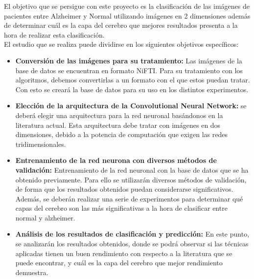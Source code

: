 
El objetivo que se persigue con este proyecto es la clasificación de las imágenes de pacientes entre Alzheimer y Normal utilizando imágenes en 2 dimensiones además de determinar cuál es la capa del cerebro que mejores resultados presenta a la hora de realizar esta clasificación. \\

El estudio que se realiza puede dividirse en los siguientes objetivos específicos:
\begin{itemize}
	\item \textbf{Conversión de las imágenes para su tratamiento:} Las imágenes de la base de datos se encuentran en formato NiFTI. Para su tratamiento con los algoritmos, debemos convertirlas a un formato con el que estos puedan tratar. Con esto se creará la base de datos para su uso en los distintos experimentos.
	\item \textbf{Elección de la arquitectura de la Convolutional Neural Network:} se deberá elegir una arquitectura para la red neuronal basándonos en la literatura actual. Esta arquitectura debe tratar con imágenes en dos dimensiones, debido a la potencia de computación que exigen las redes tridimensionales.
	\item \textbf{Entrenamiento de la red neurona con diversos métodos de validación:} Entrenamiento de la red neuronal con la base de datos que se ha obtenido previamente. Para ello se utilizarán diversos métodos de validación, de forma que los resultados obtenidos puedan considerarse significativos. Además, se deberán realizar una serie de experimentos para determinar qué capas del cerebro son las más significativas a la hora de clasificar entre normal y alzheimer.
	\item \textbf{Análisis de los resultados de clasificación y predicción:} En este punto, se analizarán los resultados obtenidos, donde se podrá observar si las técnicas aplicadas tienen un buen rendimiento con respecto a la literatura que se puede encontrar, y cuál es la capa del cerebro que mejor rendimiento demuestra.
\end{itemize}
